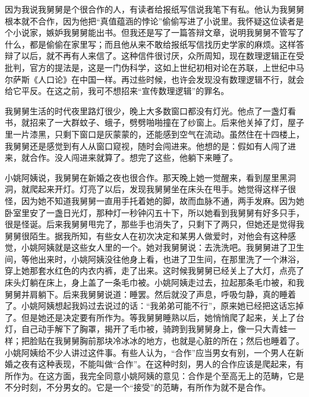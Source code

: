 因为我说我舅舅是个很合作的人，有读者给报纸写信说我笔下有私。他认为我舅舅根本就不合作，因为他把“真值蕴涵的悖论”偷偷写进了小说里。我怀疑这位读者是个小说家，嫉妒我舅舅能出书。但我还是写了一篇答辩文章，说明我舅舅不管写了什么，都是偷偷在家里写；而且他从来不敢给报纸写信找历史学家的麻烦。这样答辩了以后，就不再有人来信了。这种信件很讨厌，众所周知，现在数理逻辑正在受批判，官方的提法是，这是一门伪科学，这如上世纪初相对论在苏联，上世纪中马尔萨斯《人口论》在中国一样。再过些时候，也许会发现没有数理逻辑不行，就会给它平反。在这之前，我可不想招来“宣传数理逻辑”的罪名。 

我舅舅生活的时代夜里路灯很少，晚上大多数窗口都没有灯光。他点了一盏灯看书，就招来了一大群蚊子、蛾子，劈劈啪啪撞在了纱窗上。后来他关掉了灯，屋子里一片漆黑，只剩下窗口是灰蒙蒙的，还能感到空气在流动。虽然住在十四楼上，我舅舅还是感觉到有人从窗口窥视，随时会闯进来。他想的是：假如有人闯了进来，就合作。没人闯进来就算了。想完了这些，他躺下来睡了。 

小姚阿姨说，我舅舅在新婚之夜也很合作。那天晚上她一觉醒来，看到屋里黑洞洞，就爬起来开灯。灯亮了以后，发现我舅舅坐在床头在甩手。她觉得这样子很怪，因为她不知道我舅舅一直用手托着她的脚，故而血脉不通，两手发麻。因为她卧室里安了一盏日光灯，那种灯一秒钟闪五十下，所以她看到我舅舅有好多只手，很是怪诞。后来我舅舅甩完了，那些手也消失了，只剩下了两只，但她还是觉得我舅舅很陌生。据我所知，有些女人在初次决定和某男人做爱时，对他会有这种感觉，小姚阿姨就是这些女人里的一个。她对我舅舅说：去洗洗吧。我舅舅进了卫生间，等他出来时，小姚阿姨没往他身上看，也进了卫生间，在那里洗了一个淋浴，穿上她那套水红色的内衣内裤，走了出来。这时候我舅舅已经关上了大灯，点亮了床头灯躺在床上，身上盖了一条毛巾被。小姚阿姨走过去，拉起那条毛巾被，和我舅舅并肩躺下。后来我舅舅说道：睡罢。然后就没了声息，呼吸匀静，真的睡着了。小姚阿姨想起我妈过去说过的话：“我弟弟可能不行”，原来她已经把这话忘掉了。但是她还是决定要有所作为。等我舅舅睡熟以后，她悄悄爬了起来，关上了台灯，自己动手解下了胸罩，揭开了毛巾被，骑跨到我舅舅身上，像一只大青蛙一样；把脸贴在我舅舅胸前那块冷冰冰的地方，也就是心脏的所在；然后也睡着了。小姚阿姨给不少人讲过这件事。有些人认为，“合作”应当男女有别，一个男人在新婚之夜有这种表现，不能叫做“合作”。在这种时刻，男人的合作应该是爬起来，有所作为。在这方面，我完全同意小姚阿姨的意见：合作是个至高无上的范畴，它是不分时刻，不分男女的。它是一个“接受”的范畴，有所作为就不是合作。 

